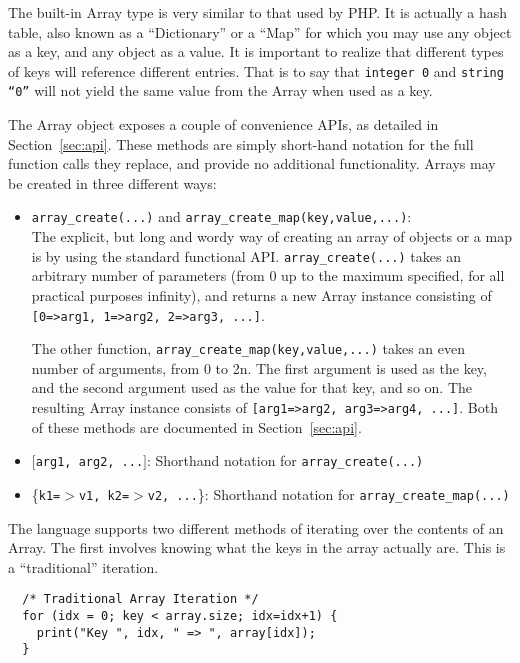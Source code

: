 The built-in Array type is very similar to that used by PHP. It is actually
a hash table, also known as a ``Dictionary'' or a ``Map'' for which you may use
any object as a key, and any object as a value. It is important to realize that
different types of keys will reference different entries. That is to say that
{\tt integer 0} and {\tt string ``0''} will not yield the same value from the
Array when used as a key.

The Array object exposes a couple of convenience APIs, as detailed in Section~\ref{sec:api}.
These methods are simply short-hand notation for the full function calls they
replace, and provide no additional functionality. Arrays may be created in
three different ways:

\begin{itemize}
\item {\tt array\_create(...)} and {\tt array\_create\_map(key,value,...)}:\\
  The explicit, but long and wordy way of creating an array of objects or a map is by using
  the standard functional API. {\tt array\_create(...)} takes an arbitrary number
  of parameters (from 0 up to the maximum specified, for all practical purposes infinity),
  and returns a new Array instance consisting of {\tt [0=>arg1, 1=>arg2, 2=>arg3, ...]}.
  
  The other function, {\tt array\_create\_map(key,value,...)} takes an even number of
  arguments, from 0 to 2n. The first argument is used as the key, and the second argument
  used as the value for that key, and so on. The resulting Array instance consists
  of {\tt [arg1=>arg2, arg3=>arg4, ...]}. Both of these methods are documented in Section~\ref{sec:api}.
\item {\tt $[$arg1, arg2, ...$]$}: Shorthand notation for {\tt array\_create(...)}
\item \{{\tt k1=$>$v1, k2=$>$v2, ...}\}: Shorthand notation for {\tt array\_create\_map(...)}
\end{itemize}

The \ModLang language supports two different methods of iterating over the 
contents of an Array. The first involves knowing what the keys in the array
actually are. This is a ``traditional'' iteration.

\lstset{language=C++}
\begin{lstlisting}  
  /* Traditional Array Iteration */
  for (idx = 0; key < array.size; idx=idx+1) {
    print("Key ", idx, " => ", array[idx]);
  } 
\end{lstlisting}

